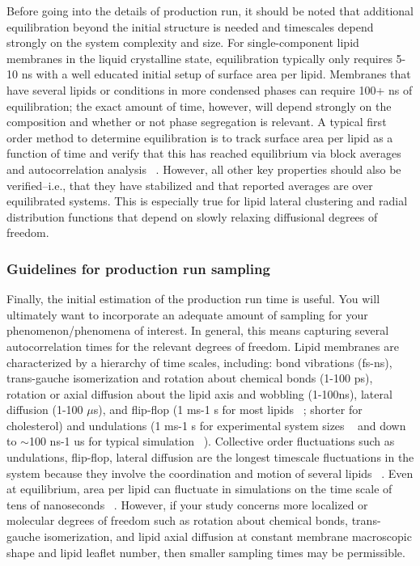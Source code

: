 \documentclass[9pt,bestpractices,pubversion]{livecoms}
\begin{document}
Before going into the details of production run, it should be noted that additional equilibration beyond the initial structure is needed and timescales depend strongly on the system complexity and size.
For single-component lipid membranes in the liquid crystalline state, equilibration typically only requires 5-10 ns with a well educated initial setup of surface area per lipid.
Membranes that have several lipids or conditions in more condensed phases can require 100+ ns of equilibration; the exact amount of time, however, will depend strongly on the composition and whether or not phase segregation is relevant.
A typical first order method to determine equilibration is to track surface area per lipid as a function of time and verify that this has reached equilibrium via block averages and autocorrelation analysis ~\cite{Venable2015}.
However, all other key properties should also be verified--i.e., that they have stabilized and that reported averages are over equilibrated systems.
This is especially true for lipid lateral clustering and radial distribution functions that depend on slowly relaxing diffusional degrees of freedom.

\subsubsection{Guidelines for production run sampling}
\label{subsubsec:prodrun}
Finally, the initial estimation of the production run time is useful.
You will ultimately want to incorporate an adequate amount of sampling for your phenomenon/phenomena of interest.
In general, this means capturing several autocorrelation times for the relevant degrees of freedom.
Lipid membranes are characterized by a hierarchy of time scales, including: bond vibrations (fs-ns), trans-gauche isomerization and rotation about chemical bonds (1-100 ps), rotation or axial diffusion about the lipid axis and wobbling (1-100ns), lateral diffusion (1-100 $\mu$s), and flip-flop (1 ms-1 s for most lipids ~\cite{Vermeer2007,Konig1996,Leftin2011}; shorter for cholesterol) and undulations (1 ms-1 s for experimental system sizes ~\cite{Vermeer2007} and down to $\sim$100 ns-1 us for typical simulation ~\cite{Bochicchio2016}).
Collective order fluctuations such as undulations, flip-flop, lateral diffusion are the longest timescale fluctuations in the system because they involve the coordination and motion of several lipids  ~\cite{Vermeer2007}.
Even at equilibrium, area per lipid can fluctuate in simulations on the time scale of tens of nanoseconds  ~\cite{Poger2016,Venable2015}.
However, if your study concerns more localized or molecular degrees of freedom such as rotation about chemical bonds, trans-gauche isomerization, and lipid axial diffusion at constant membrane macroscopic shape and lipid leaflet number, then smaller sampling times may be permissible.
\end{document}

